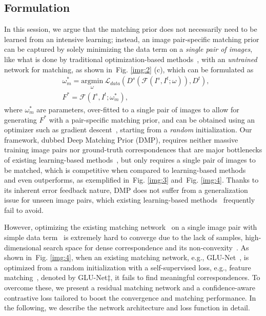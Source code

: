 \documentclass[10pt,twocolumn,letterpaper]{article}
\newcommand{\figref}[1]{Fig. \ref{#1}}
\begin{document}
\subsection{Formulation}\label{sec:3_2}
In this session, we argue that the matching prior does not necessarily need to be learned from an intensive learning; instead, an image pair-specific matching prior can be captured by solely minimizing the data term on a \emph{single pair of images}, like what is done by traditional optimization-based methods~\cite{liu2010sift,kim2017dctm}, with an \emph{untrained} network for matching, as shown in~\figref{img:2} (c), which can be formulated as 
\begin{equation}
\begin{split}
&\omega^{*}_m =\underset{\omega}{\mathrm{argmin}}
\ \mathcal{L}_{data}(D^{s}(\mathcal{F}(I^s,I^t;\omega)),{D}^{t}), \\
&F^{*}=\mathcal{F}(I^s,I^t;\omega^{*}_m),
\end{split}
\end{equation}
where $\omega^{*}_m$ are parameters, over-fitted to a single pair of images to allow for generating $F^{*}$ with a pair-specific matching prior, and can be obtained using an optimizer such as gradient descent~\cite{kingma2014adam}, starting from a \emph{random} initialization. Our framework, dubbed Deep Matching Prior (DMP), requires neither massive training image pairs nor ground-truth correspondences that are major bottlenecks of existing learning-based methods~\cite{melekhov2019dgc,truong2020glu,shen2020ransac}, but only requires a single pair of images to be matched, which is competitive when compared to learning-based methods~\cite{melekhov2019dgc,kim2019semantic,truong2020glu,shen2020ransac} and even outperforms, as exemplified in~\figref{img:3} and~\figref{img:4}. Thanks to its inherent error feedback nature, DMP does not suffer from a generalization issue for unseen image pairs, which existing learning-based methods~\cite{melekhov2019dgc,kim2019semantic,truong2020glu,shen2020ransac} frequently fail to avoid.

However, optimizing the existing matching network~\cite{melekhov2019dgc,truong2020glu,shen2020ransac} on a single image pair with simple data term~\cite{liu2010sift,kim2017dctm} is extremely hard to converge due to the lack of samples, high-dimensional search space for dense correspondence and its non-convexity~\cite{kim2017dctm}. 
As shown in~\figref{img:4}, when an existing matching network, e.g., GLU-Net~\cite{yang2019volumetric}, is optimized from a random initialization with a self-supervised loss, e.g., feature matching~\cite{shen2020ransac}, denoted by GLU-Net$\ddagger$, it fails to find meaningful correspondences. 
To overcome these, we present a residual matching network and a confidence-aware contrastive loss tailored to boost the convergence and matching performance. In the following, we describe the network architecture and loss function in detail.
\end{document}
